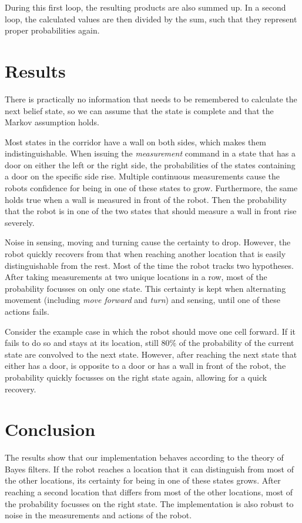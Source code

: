 \documentclass[10pt,a4paper]{article}
\begin{document}
		During this first loop, the resulting products are also summed up. In a second loop, the calculated values are then divided by the sum, such that they represent proper probabilities again.
	
	\section{Results}
	There is practically no information that needs to be remembered to calculate the next belief state, so we can assume that the state is complete and that the Markov assumption holds.
	
	Most states in the corridor have a wall on both sides, which makes them indistinguishable.
	When issuing the \textit{measurement} command in a state that has a door on either the left or the right side, the probabilities of the states containing a door on the specific side rise. Multiple continuous measurements cause the robots confidence for being in one of these states to grow.
	Furthermore, the same holds true when a wall is measured in front of the robot. Then the probability that the robot is in one of the two states that should measure a wall in front rise severely.
	
	Noise in sensing, moving and turning cause the certainty to drop. However, the robot quickly recovers from that when reaching another location that is easily distinguishable from the rest.
	Most of the time the robot tracks two hypotheses. After taking measurements at two unique locations in a row, most of the probability focusses on only one state. This certainty is kept when alternating movement (including \textit{move forward} and \textit{turn}) and sensing, until one of these actions fails.
	
	Consider the example case in which the robot should move one cell forward. If it fails to do so and stays at its location, still $80\%$ of the probability of the current state are convolved to the next state. However, after reaching the next state that either has a door, is opposite to a door or has a wall in front of the robot, the probability quickly focusses on the right state again, allowing for a quick recovery.
	
	\section{Conclusion}
	The results show that our implementation behaves according to the theory of Bayes filters. If the robot reaches a location that it can distinguish from most of the other locations, its certainty for being in one of these states grows. After reaching a second location that differs from most of the other locations, most of the probability focusses on the right state. The implementation is also robust to noise in the measurements and actions of the robot.
	
\end{document}
